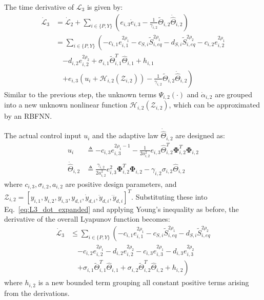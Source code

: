 The time derivative of $\mathcal{L}_3$ is given by:
\begin{align}
    \dot{\mathcal{L}}_3 &= \dot{\mathcal{L}}_2 + \sum_{i \in \{P,Y\}} \left( e_{i,3} \dot{e}_{i,3} - \frac{1}{\gamma_{i,2}} \widetilde{\Theta}_{i,2} \dot{\widehat{\Theta}}_{i,2} \right) \nonumber \\
    &= \sum_{i \in \{P,Y\}} \left( -c_{i,1} e_{i,1}^{2\rho_1} - c_{S,i} \widetilde{S}_{i,eq}^{2\rho_1} - d_{S,i} \widetilde{S}_{i,eq}^{2\rho_2} - c_{i,2} e_{i,2}^{2\rho_1} \right. \nonumber \\
    &\quad \left. - d_{i,2} e_{i,2}^{2\rho_2} + \sigma_{i,1} \widetilde{\Theta}_{i,1}^T \widehat{\Theta}_{i,1} + h_{i,1} \right. \nonumber \\
    &\quad \left. + e_{i,3} (u_i + \mathcal{H}_{i,2}(\mathcal{Z}_{i,2})) - \frac{1}{\gamma_{i,2}} \widetilde{\Theta}_{i,2} \dot{\widehat{\Theta}}_{i,2} \right) \label{eq:L3_dot_expanded}
\end{align}
Similar to the previous step, the unknown terms $\Psi_{i,2}(\cdot)$ and $\dot{\alpha}_{i,2}$ are grouped into a new unknown nonlinear function $\mathcal{H}_{i,2}(\mathcal{Z}_{i,2})$, which can be approximated by an RBFNN.

The actual control input $u_i$ and the adaptive law $\dot{\widehat{\Theta}}_{i,2}$ are designed as:
\begin{align}
    u_i &\triangleq  - c_{i,3} e_{i,3}^{2\rho_1-1} - \frac{1}{2a_{i,2}^2} e_{i,3} \widehat{\Theta}_{i,2}^T \mathbf{\Phi}_{i,2}^T \mathbf{\Phi}_{i,2} \label{eq:uk} \\
    \dot{\widehat{\Theta}}_{i,2} &\triangleq \frac{\gamma_{i,2}}{2a_{i,2}^2} e_{i,3}^2 \mathbf{\Phi}_{i,2}^T \mathbf{\Phi}_{i,2} - \gamma_{i,2} \sigma_{i,2} \widehat{\Theta}_{i,2} \label{eq:W2_hat_dot}
\end{align}
where $c_{i,3}, \sigma_{i,2}, a_{i,2}$ are positive design parameters, and $\mathcal{Z}_{i,2} = [y_{i,1}, y_{i,2}, y_{i,3}, y_{d,i},\dot{y}_{d,i},\ddot{y}_{d,i}, \dddot{y}_{d,i}]^T$. Substituting these into Eq.~\eqref{eq:L3_dot_expanded} and applying Young's inequality as before, the derivative of the overall Lyapunov function becomes:
\begin{align}
    \dot{\mathcal{L}}_3 &\le \sum_{i \in \{P,Y\}} \left( -c_{i,1} e_{i,1}^{2\rho_1} - c_{S,i} \widetilde{S}_{i,eq}^{2\rho_1} - d_{S,i} \widetilde{S}_{i,eq}^{2\rho_2} \right. \nonumber \\
    &\quad \left. -c_{i,2} e_{i,2}^{2\rho_1} -d_{i,2} e_{i,2}^{2\rho_2} - c_{i,3} e_{i,3}^{2\rho_1} - d_{i,3} e_{i,3}^{2\rho_2} \right. \nonumber \\
    &\quad \left. + \sigma_{i,1} \widetilde{\Theta}_{i,1}^T \widehat{\Theta}_{i,1} + \sigma_{i,2} \widetilde{\Theta}_{i,2}^T \widehat{\Theta}_{i,2} + h_{i,2} \right) \label{eq:L3_dot_final}
\end{align}
where $h_{i,2}$ is a new bounded term grouping all constant positive terms arising from the derivations.

